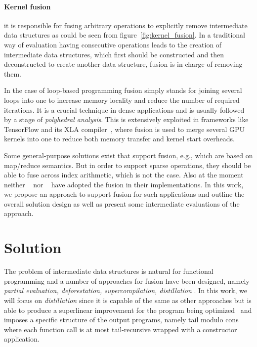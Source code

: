 \documentclass[10pt,conference]{IEEEtran}
\begin{document}
\paragraph*{Kernel fusion}
it is responsible for fusing arbitrary operations to explicitly remove intermediate data structures as could be seen from figure~\ref{fig:kernel_fusion}.
In a traditional way of evaluation having consecutive operations leads to the creation of intermediate data structures, which first should be constructed and then deconstructed to create another data structure, fusion is in charge of removing them.


In the case of loop-based programming fusion simply stands for joining several loops into one to increase memory locality and reduce the number of required iterations.
It is a crucial technique in dense applications and is usually followed by a stage of \emph{polyhedral analysis}.
This is extensively exploited in frameworks like TensorFlow and its XLA compiler~\cite{TensorFlowXLA}, where fusion is used to merge several GPU kernels into one to reduce both memory transfer and kernel start overheads. 

Some general-purpose solutions exist that support fusion, e.g., \cite{Futhark} which are based on map/reduce semantics.
But in order to support sparse operations, they should be able to fuse across index arithmetic, which is not the case.
Also at the moment neither ~\cite{SuiteSparse}  nor ~\cite{yang2020graphblast} have adopted the fusion in their implementations.
In this work, we propose an approach to support fusion for such applications and outline the overall solution design as well as present some intermediate evaluations of the approach.

\section{Solution}

The problem of intermediate data structures is natural for functional programming and
a number of approaches for fusion have been designed, namely \emph{partial evaluation, deforestation, supercompilation, distillation} \cite{jones, WADLER1990231, supercompilation, distillation}.
In this work, we will focus on \emph{distillation} since it is capable of the same as other approaches but is able to produce a superlinear improvement for the program being optimized~\cite{distillation} and imposes a specific structure of the output programs, namely tail modulo cons where each function call is at most tail-recursive wrapped with a constructor application.
\end{document}

